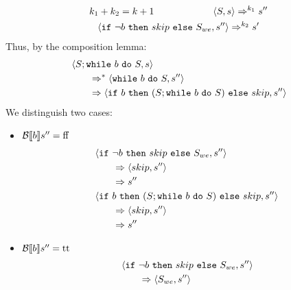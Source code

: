\begin{exercise}
\begin{enumerate}
\begin{itemize}
\begin{itemize}
\begin{itemize}
                                    \begin{gather*}
                                        k_1 + k_2 = k + 1 \qquad\qquad\qquad \left<S, s\right> \Rightarrow^{k_1} s'' \\
                                        \left<\texttt{if}\ \neg b\ \texttt{then}\ skip\ \texttt{else}\ S_{we}, s''\right> \Rightarrow^{k_2} s'
                                    \end{gather*}
                                    Thus, by the composition lemma:
                                    \begin{align*}
                                        &\left<S; \texttt{while}\ b\ \texttt{do}\ S, s\right>
                                        \\&\qquad\Rightarrow^* \left<\texttt{while}\ b\ \texttt{do}\ S, s''\right>
                                        \\&\qquad\Rightarrow \left<\texttt{if}\ b\ \texttt{then}\ (S; \texttt{while}\ b\ \texttt{do}\ S)\ \texttt{else}\ skip, s''\right>
                                    \end{align*}
                                    We distinguish two cases:
                                    \begin{itemize}
                                        \item $\mathcal{B} \llbracket b \rrbracket s'' = \text{ff}$
                                            \begin{align*}
                                                &\left<\texttt{if}\ \neg b\ \texttt{then}\ skip\ \texttt{else}\ S_{we}, s''\right>
                                                \\&\qquad\Rightarrow \left<skip, s''\right>
                                                \\&\qquad\Rightarrow s''
                                                \\
                                                &\left<\texttt{if}\ b\ \texttt{then}\ (S; \texttt{while}\ b\ \texttt{do}\ S)\ \texttt{else}\ skip, s''\right>
                                                \\&\qquad\Rightarrow \left<skip, s''\right>
                                                \\&\qquad\Rightarrow s''
                                            \end{align*}
                                        \item $\mathcal{B} \llbracket b \rrbracket s'' = \text{tt}$
                                        \begin{align*}
                                            &\instr{\wif{\neg b}{skip}{S_{we}}}{s''}
                                            \\&\qquad\Rightarrow \instr{S_{we}}{s''}

\end{align*}
\end{itemize}
\end{itemize}
\end{itemize}
\end{itemize}
\end{enumerate}
\end{exercise}
